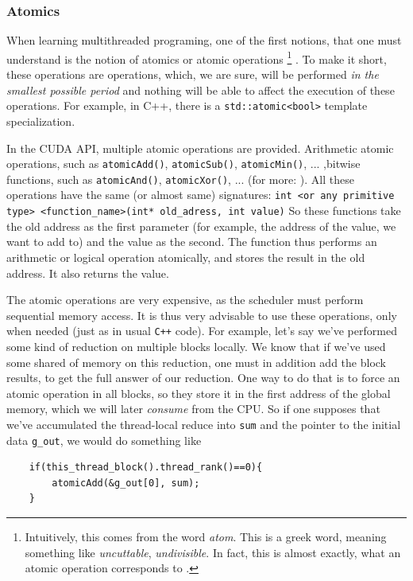 \subsubsection*{Atomics}
When learning multithreaded programing, one of the first notions, that one must understand
is the notion of atomics or atomic operations \footnote{Intuitively, 
this comes from the word \textit{atom}. This is a greek word, meaning something 
like \textit{uncuttable}, \textit{undivisible}. In fact, this is almost exactly, what an atomic operation corresponds to 
\cite{atomics} .}
. To make it short, these operations are operations, which, we are sure, will be performed \textit{in the smallest possible
period} and nothing will be able to affect the execution of these operations.
For example, in C++, there is a \verb|std::atomic<bool>| template specialization. 


In the CUDA API, multiple atomic operations are provided. Arithmetic atomic operations, 
such as \verb|atomicAdd()|, \verb|atomicSub()|, \verb|atomicMin()|, ... 
,bitwise functions, such as \verb|atomicAnd()|, \verb|atomicXor()|, ...
(for more: \cite{center}).
All these operations have the same (or almost same) signatures: 
\verb|int <or any primitive type> <function_name>(int* old_adress, int value)|
So these functions take the old address as the first parameter (for example, the address of the value, we want to add to) and 
the value as the second. The function thus performs an arithmetic or logical operation atomically, 
and stores the result in the old address. It also returns the value.


The atomic operations are very expensive, as the scheduler must perform sequential memory access. 
It is thus very advisable to use these operations, only when needed (just as in usual \verb|C++| code).
For example, let's say we've performed some kind of reduction on multiple blocks locally. 
We know that if we've used some shared of memory on this reduction, one must in addition add the block results, to 
get the full answer of our reduction. One way to do that is to force an atomic operation in all blocks, so they store it 
in the first address of the global memory, which we will later \textit{consume} from the CPU. 
So if one  supposes that we've accumulated the thread-local reduce into \verb|sum| and the pointer to the 
initial data \verb|g_out|, we would do something like

\begin{verbatim}
    if(this_thread_block().thread_rank()==0){
        atomicAdd(&g_out[0], sum);
    }
\end{verbatim}


